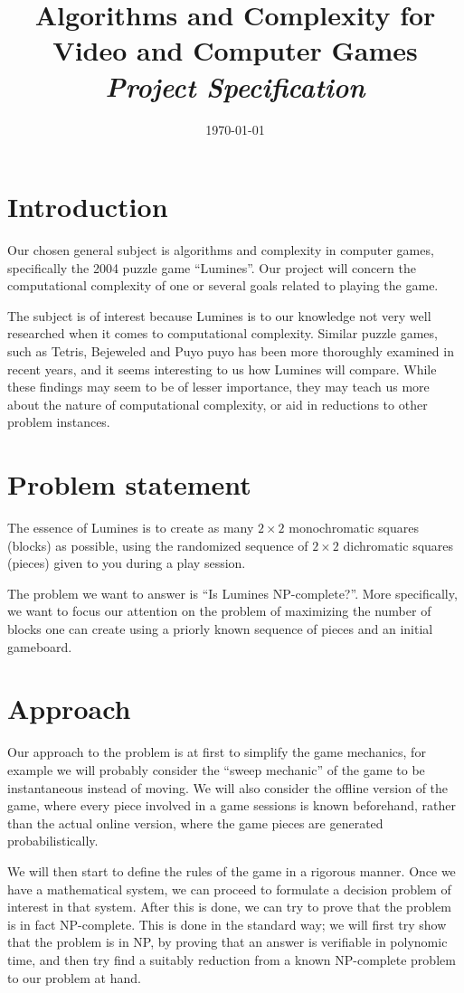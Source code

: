 \documentclass[a4paper,10pt]{article}
\title{Algorithms and Complexity for Video and Computer Games \\
    \textit{Project Specification}} %
\author{\cauthor} %
\date{\today} %
\begin{document}
\maketitle %

\section{Introduction}
Our chosen general subject is algorithms and complexity in computer games, specifically the 2004 puzzle game ``Lumines''. Our project will concern the computational complexity of one or several goals related to playing the game.

The subject is of interest because Lumines is to our knowledge not very well researched when it comes to computational complexity. Similar puzzle games, such as Tetris, Bejeweled and Puyo puyo has been more thoroughly examined in recent years, and it seems interesting to us how Lumines will compare. While these findings may seem to be of lesser importance, they may teach us more about the nature of computational complexity, or aid in reductions to other problem instances.

\section{Problem statement}
The essence of Lumines is to create as many $2 \times 2$ monochromatic squares (blocks) as possible, using the randomized sequence of $2 \times 2$ dichromatic squares (pieces) given to you during a play session.

The problem we want to answer is ``Is Lumines NP-complete?''. More specifically, we want to focus our attention on the problem of maximizing the number of blocks one can create using a priorly known sequence of pieces and an initial gameboard. 

\section{Approach}
Our approach to the problem is at first to simplify the game mechanics, for example we will probably consider the ``sweep mechanic'' of the game to be instantaneous instead of moving. We will also consider the offline version of the game, where every piece involved in a game sessions is known beforehand, rather than the actual online version, where the game pieces are generated probabilistically.

We will then start to define the rules of the game in a rigorous manner. Once we have a mathematical system, we can proceed to formulate a decision problem of interest in that system. After this is done, we can try to prove that the problem is in fact NP-complete. This is done in the standard way; we will first try show that the problem is in NP, by proving that an answer is verifiable in polynomic time, and then try find a suitably reduction from a known NP-complete problem to our problem at hand.
\end{document}
